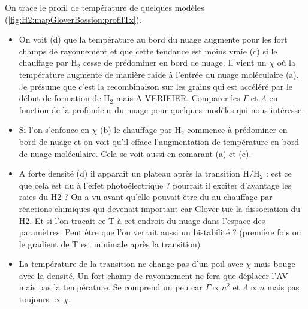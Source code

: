 On trace le profil de température de quelques modèles (\autoref{fig:H2:mapGloverBossion:profilTx}). 
\begin{itemize}
    \item On voit (d) que la température au bord du nuage augmente pour les fort champs de rayonnement et que cette tendance est moins vraie (c) si le chauffage par $\mathrm{H}_2$ cesse de prédominer en bord de nuage. Il vient un $\chi$ où la température augmente de manière raide à l'entrée du nuage moléculaire (a). Je présume que c'est la recombinaison sur les grains qui est accéléré par le début de formation de $\mathrm{H}_2$ mais A VERIFIER. Comparer les $\Gamma$ et $\Lambda$ en fonction de la profondeur du nuage pour quelques modèles qui nous intéresse.
    \item Si l'on s'enfonce en $\chi$ (b) le chauffage par $\mathrm{H}_2$ commence à prédominer en bord de nuage et on voit qu'il efface l'augmentation de température en bord de nuage moléculaire. Cela se voit aussi en comarant (a) et (c).
    \item A forte densité (d) il apparaît un plateau après la transition $\mathrm{H}/\mathrm{H}_2$ : est ce que cela est du à l'effet photoélectrique ? pourrait il exciter d'avantage les raies du H2 ? On a vu avant qu'elle pouvait être du au chauffage par réactions chimiques qui devenait important car Glover tue la dissociation du H2. Et si l'on tracait ce T à cet endroit du nuage dans l'espace des paramètres. Peut être que l'on verrait aussi un bistabilité ? (première fois ou le gradient de T est minimale après la transition)
    \item La température de la transition ne change pas d'un poil avec $\chi$ mais bouge avec la densité. Un fort champ de rayonnement ne fera que déplacer l'AV mais pas la température. Se comprend un peu car $\Gamma \propto n^2$ et $\Lambda \propto n $ mais pas toujours $\propto \chi$.
\end{itemize}

